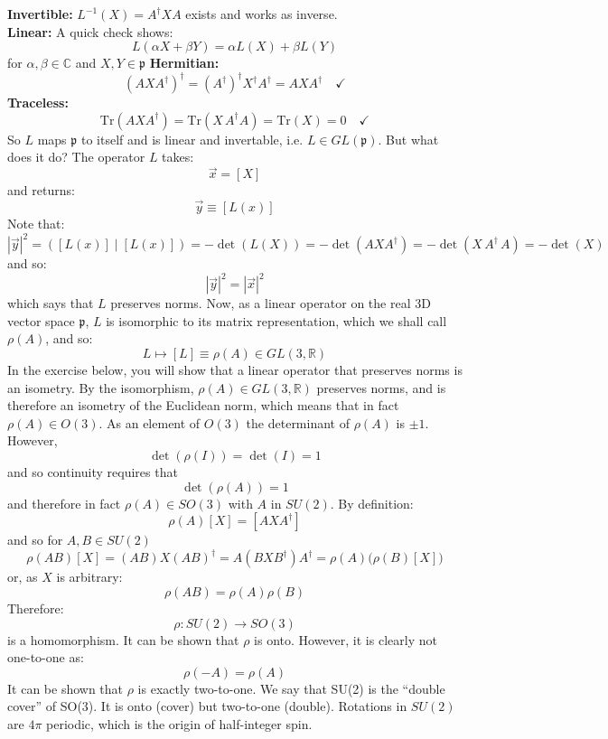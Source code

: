 \documentclass[12pt]{article}
\begin{document}
\noindent\textbf{Invertible:} $L^{-1}(X) = A^\dagger X A$ exists and works as inverse.\\[3pt]
\noindent\textbf{Linear:} A quick check shows:
$$L(\alpha X + \beta Y) = \alpha L(X) + \beta L(Y)$$
for $\alpha,\beta \in \mathbb{C}$ and $X,Y \in \mathfrak{p}$
\noindent\textbf{Hermitian:}
\begin{equation*}
  (AXA^\dagger)^\dagger = (A^\dagger)^\dagger X^\dagger A^\dagger = AXA^\dagger \quad\checkmark
\end{equation*}
\noindent\textbf{Traceless:}
\begin{equation*}
  \mathrm{Tr}(AXA^\dagger) = \mathrm{Tr}(X\,A^\dagger A) = \mathrm{Tr}(X) = 0 \quad\checkmark
\end{equation*}
So $L$ maps $\mathfrak{p}$ to itself and is linear and invertable, i.e. $L\in GL(\mathfrak{p})$.  But what does it do?  The operator $L$ takes:
$$\vec{x} = [X]$$
and returns:
$$\vec{y} \equiv [L(x)]$$
Note that:
$$|\vec{y}|^2 = ([L(x)] \mid [L(x)]) = -\det(L(X)) = -\det(AXA^\dagger) = -\det(X\,A^\dagger\,A) = -\det(X)$$
and so:
$$|\vec{y}|^2 = |\vec{x}|^2$$
which says that $L$ preserves norms.  Now, as a linear operator on the
real 3D vector space $\mathfrak{p}$, $L$ is isomorphic to its matrix
representation, which we shall call $\rho(A)$, and so:
$$L \mapsto [L] \equiv \rho(A) \in GL(3,\mathbb{R})$$ In the exercise
below, you will show that a linear operator that preserves norms is an
isometry. By the isomorphism, $\rho(A) \in GL(3, \mathbb{R})$
preserves norms, and is therefore an isometry of the Euclidean norm,
which means that in fact $\rho(A) \in O(3)$.  As an element of $O(3)$ the determinant of $\rho(A)$ is $\pm 1$.  However,
$$\det(\rho(I))=\det(I) = 1$$
and so continuity requires that
$$\det(\rho(A))=1$$
and therefore in fact $\rho(A) \in SO(3)$ with $A$ in $SU(2)$. By definition:
$$\rho(A)[X] = [A X A^\dagger]$$
and so for $A,B \in SU(2)$
\begin{equation*}
  \rho(AB)[X] = (AB)X(AB)^\dagger = A(BXB^\dagger)A^\dagger = \rho(A)\bigl(\rho(B)[X]\bigr) 
\end{equation*}
or, as $X$ is arbitrary:
\begin{equation*}
  \rho(AB) = \rho(A) \rho(B)
\end{equation*}
Therefore:
$$\rho: SU(2) \to SO(3)$$
is a homomorphism.  It can be shown that $\rho$ is onto.  However, it is clearly not one-to-one as:
$$\rho(-A) = \rho(A)$$
It can be shown that $\rho$ is exactly two-to-one.  We say that SU(2) is the ``double cover'' of SO(3).  It is onto (cover) but two-to-one (double).  Rotations in $SU(2)$ are $4\pi$ periodic, which is the origin of half-integer spin.\\
\end{document}
